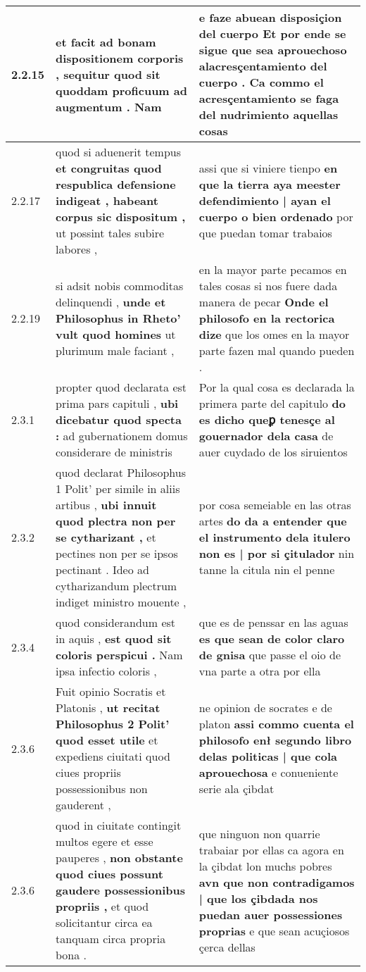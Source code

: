 \begin{tabular}{|p{1cm}|p{6.5cm}|p{6.5cm}|}
2.2.15 & et facit ad bonam dispositionem corporis , \textbf{ sequitur quod sit quoddam proficuum ad augmentum . } Nam & e faze abuean disposiçion del cuerpo \textbf{ Et por ende se sigue que sea aprouechoso alacresçentamiento del cuerpo . } Ca commo el acresçentamiento se faga del nudrimiento aquellas cosas \\\hline
2.2.17 & quod si aduenerit tempus \textbf{ et congruitas quod respublica defensione indigeat , habeant corpus sic dispositum , } ut possint tales subire labores , & assi que si viniere tienpo \textbf{ en que la tierra aya meester defendimiento | ayan el cuerpo o bien ordenado } por que puedan tomar trabaios \\\hline
2.2.19 & si adsit nobis commoditas delinquendi , \textbf{ unde et Philosophus in Rheto’ vult quod homines } ut plurimum male faciant , & en la mayor parte pecamos en tales cosas si nos fuere dada manera de pecar \textbf{ Onde el philosofo en la rectorica dize } que los omes en la mayor parte fazen mal quando pueden . \\\hline
2.3.1 & propter quod declarata est prima pars capituli , \textbf{ ubi dicebatur quod specta : } ad gubernationem domus considerare de ministris & Por la qual cosa es declarada la primera parte del capitulo \textbf{ do es dicho queꝑ tenesçe al gouernador dela casa } de auer cuydado de los siruientos \\\hline
2.3.2 & quod declarat Philosophus 1 Polit’ per simile in aliis artibus , \textbf{ ubi innuit quod plectra non per se cytharizant , } et pectines non per se ipsos pectinant . Ideo ad cytharizandum plectrum indiget ministro mouente , & por cosa semeiable en las otras artes \textbf{ do da a entender que el instrumento dela itulero non es | por si çitulador } nin tanne la citula nin el penne \\\hline
2.3.4 & quod considerandum est in aquis , \textbf{ est quod sit coloris perspicui . } Nam ipsa infectio coloris , & que es de penssar en las aguas \textbf{ es que sean de color claro de gnisa } que passe el oio de vna parte a otra por ella \\\hline
2.3.6 & Fuit opinio Socratis et Platonis , \textbf{ ut recitat Philosophus 2 Polit’ quod esset utile } et expediens ciuitati quod ciues propriis possessionibus non gauderent , & ne opinion de socrates e de platon \textbf{ assi commo cuenta el philosofo enł segundo libro delas politicas | que cola aprouechosa } e conueniente serie ala çibdat \\\hline
2.3.6 & quod in ciuitate contingit multos egere et esse pauperes , \textbf{ non obstante quod ciues possunt gaudere possessionibus propriis , } et quod solicitantur circa ea tanquam circa propria bona . & que ninguon non quarrie trabaiar por ellas ca agora en la çibdat lon muchs pobres \textbf{ avn que non contradigamos | que los çibdada nos puedan auer possessiones proprias } e que sean acuçiosos çerca dellas \\\hline

\end{tabular}
